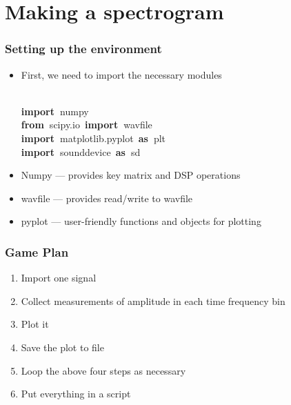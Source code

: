 \documentclass{beamer}\usepackage[]{graphicx}\usepackage[]{color}
\makeatletter
\newcommand{\hlopt}[1]{\textcolor[rgb]{0,0,0}{#1}}%
\newcommand{\hlstd}[1]{\textcolor[rgb]{0.345,0.345,0.345}{#1}}%
\newcommand{\hlkwa}[1]{\textcolor[rgb]{0.161,0.373,0.58}{\textbf{#1}}}%
\newenvironment{kframe}{%
 \def\at@end@of@kframe{}%
 \ifinner\ifhmode%
  \def\at@end@of@kframe{\end{minipage}}%
  \begin{minipage}{\columnwidth}%
 \fi\fi%
 \def\FrameCommand##1{\hskip\@totalleftmargin \hskip-\fboxsep
 \colorbox{shadecolor}{##1}\hskip-\fboxsep
     \hskip-\linewidth \hskip-\@totalleftmargin \hskip\columnwidth}%
 \MakeFramed {\advance\hsize-\width
   \@totalleftmargin\z@ \linewidth\hsize
   \@setminipage}}%
 {\par\unskip\endMakeFramed%
 \at@end@of@kframe}
\newenvironment{knitrout}{}{} %
\makeatother
\begin{document}
\section{Making a spectrogram}
\begin{frame}[fragile]
\frametitle{Setting up the environment}
\begin{itemize}
	\item First, we need to import the necessary modules
\begin{knitrout}
\color{fgcolor}\begin{kframe}
\noindent
\ttfamily
\hlstd{}\hspace*{\fill}\\
\hlkwa{import\ }\hlstd{numpy}\hspace*{\fill}\\
\hlkwa{from\ }\hlstd{scipy}\hlopt{.}\hlstd{io\ }\hlkwa{import\ }\hlstd{wavfile}\hspace*{\fill}\\
\hlkwa{import\ }\hlstd{matplotlib}\hlopt{.}\hlstd{pyplot\ }\hlkwa{as\ }\hlstd{plt}\hspace*{\fill}\\
\hlkwa{import\ }\hlstd{sounddevice\ }\hlkwa{as\ }\hlstd{sd}\hspace*{\fill}\\
\hspace*{\fill}
\mbox{}
\normalfont
\end{kframe}
\end{knitrout}
\end{itemize}

\begin{itemize}
	\item Numpy --- provides key matrix and DSP operations

	\item wavfile --- provides read/write to wavfile
	
	\item pyplot --- user-friendly functions and objects for plotting
\end{itemize}
\end{frame}

\begin{frame}[fragile]
\frametitle{Game Plan}
\begin{enumerate}
		\item Import one signal
		\item Collect measurements of amplitude in each time frequency bin 
		\item Plot it
		\item Save the plot to file
		\item Loop the above four steps as necessary
		\item Put everything in a script
\end{enumerate}
\end{frame}
\end{document}
